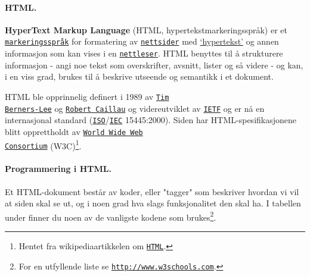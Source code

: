 \documentclass[%
oneside,                 %
final,                   %
12pt]{article}
\begin{document}

\paragraph{HTML.}
\label{section:teori:html} 

\textbf{HyperText Markup Language} (HTML, hypertekstmarkeringsspråk) er et
\href{{http://no.wikipedia.org/wiki/Markeringsspråk}}{\nolinkurl{markeringsspråk}} for
formatering av \href{{http://no.wikipedia.org/wiki/Nettside}}{\nolinkurl{nettsider}}
med \href{{http://no.wikipedia.org/wiki/Hypertekst}}{`hypertekst'} og annen
informasjon som kan vises i en
\href{{http://no.wikipedia.org/wiki/Nettleser}}{\nolinkurl{nettleser}}. HTML benyttes
til å strukturere informasjon - angi noe tekst som overskrifter,
avsnitt, lister og så videre - og kan, i en viss grad, brukes til å
beskrive utseende og semantikk i et dokument.

HTML ble opprinnelig definert i 1989 av \href{{https://no.wikipedia.org/wiki/Tim_Berners-Lee}}{\nolinkurl{Tim
Berners-Lee}} og
\href{{https://en.wikipedia.org/wiki/Robert_Cailliau}}{\nolinkurl{Robert Caillau}} og
videreutviklet av \href{{http://no.wikipedia.org/wiki/IETF}}{\nolinkurl{IETF}} og er
nå en internasjonal standard
(\href{{http://no.wikipedia.org/wiki/International_Organization_for_Standardization}}{\nolinkurl{ISO}}/\href{{http://no.wikipedia.org/wiki/International_Electrotechnical_Commission}}{\nolinkurl{IEC}}
15445:2000). Siden har HTML-spesifikasjonene blitt opprettholdt av
\href{{http://no.wikipedia.org/wiki/World_Wide_Web_Consortium}}{\nolinkurl{World Wide Web
Consortium}}
(W3C)\footnote{Hentet fra wikipediaartikkelen om \href{{http://no.wikipedia.org/wiki/HTML}}{\nolinkurl{HTML}}.}. 



\paragraph{Programmering i HTML.}

Et HTML-dokument består av koder, eller "tagger" som beskriver hvordan
vi vil at siden skal se ut, og i noen grad hva slags funksjonalitet
den skal ha. I tabellen under finner du noen av de vanligste kodene
som brukes\footnote{For en utfyllende liste se \href{{http://www.w3schools.com/tags/ref_byfunc.asp}}{\nolinkurl{http://www.w3schools.com}}.}.
\end{document}
